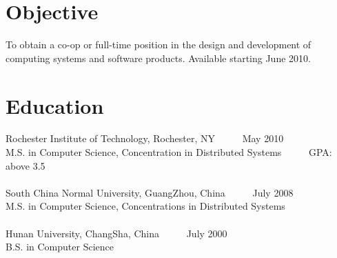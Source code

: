 \documentclass[margin]{res}
\begin{document}
 
 
 
\address{{\bf Current Address} \\ 118 East Squire Drive \#8 \\ Rochester, NY 14623 \\ }

\address{{\bf Permanent Address} \\ 1405 Hornell LN\\Smyrna, GA 30082}
 
\begin{resume} 
 
\section{Objective} 
To obtain a co-op or full-time position in the design and development of computing systems and software products. Available starting June 2010.

\section{Education} 
Rochester Institute of Technology, Rochester, NY ~~~~~May 2010\\
M.S. in Computer Science, Concentration in Distributed Systems ~~~~~GPA: above 3.5 \\
\\
South China Normal University, GuangZhou, China ~~~~~July 2008\\
M.S. in Computer Science, Concentrations in Distributed Systems \\
\\
Hunan University, ChangSha, China  ~~~~~July 2000\\
B.S. in Computer Science


\end{resume}
\end{document}
